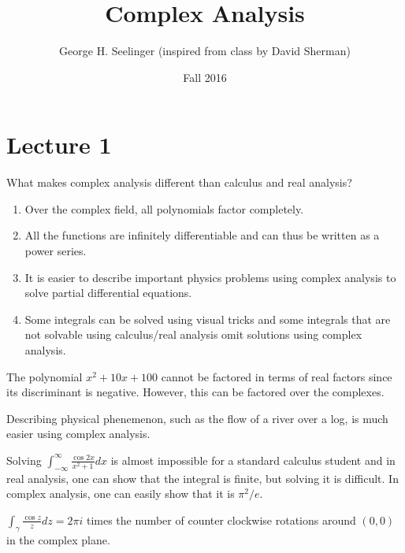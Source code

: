 \documentclass[11pt,leqno,oneside]{amsart}
\title[Complex Analysis]{Complex Analysis}
\author{George H. Seelinger (inspired from class by David Sherman)}
\date{Fall 2016}
\begin{document}
\maketitle
\section{Lecture 1}
What makes complex analysis different than calculus and real analysis?

\begin{enumerate}
    \item Over the complex field, all polynomials factor completely.
    \item All the functions are infinitely differentiable and can thus be written as a power series.
    \item It is easier to describe important physics problems using complex analysis to solve partial differential equations.
    \item Some integrals can be solved using visual tricks and some integrals that are not solvable using calculus/real analysis omit solutions using complex analysis.

\end{enumerate}
\begin{example}
    The polynomial $x^2+10x+100$ cannot be factored in terms of real factors since its discriminant is negative. However, this can be factored over the complexes.
\end{example}
\begin{example}
    Describing physical phenemenon, such as the flow of a river over a log, is much easier using complex analysis.
\end{example}
\begin{example}
    Solving $\int_{-\infty}^{\infty} \frac{\cos 2x}{x^2+1} dx$ is almost impossible for a standard calculus student and in real analysis, one can show that the integral is finite, but solving it is difficult. In complex analysis, one can easily show that it is $\pi^2/e$.
\end{example}
\begin{example}
    $\int_{\gamma} \frac{\cos z}{z} dz = 2 \pi i $ times the number of counter clockwise rotations around $(0,0)$ in the complex plane.
\end{example}
\end{document}
